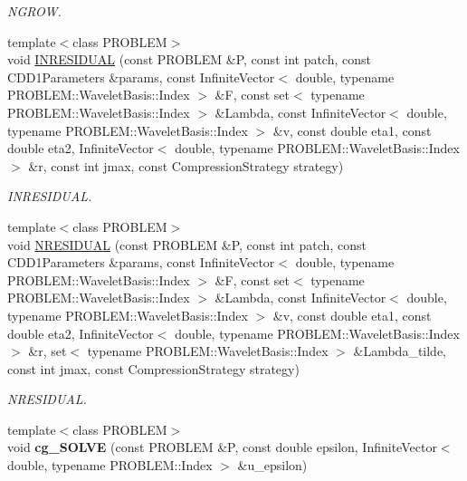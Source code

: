 \begin{CompactItemize}
\begin{CompactList}\small\item\em NGROW. \item\end{CompactList}\item 
{\footnotesize template$<$class PROBLEM$>$ }\\void \hyperlink{namespaceFrameTL_cd7462527bff134a7c142ee0471d6ab2}{INRESIDUAL} (const PROBLEM \&P, const int patch, const CDD1Parameters \&params, const InfiniteVector$<$ double, typename PROBLEM::WaveletBasis::Index $>$ \&F, const set$<$ typename PROBLEM::WaveletBasis::Index $>$ \&Lambda, const InfiniteVector$<$ double, typename PROBLEM::WaveletBasis::Index $>$ \&v, const double eta1, const double eta2, InfiniteVector$<$ double, typename PROBLEM::WaveletBasis::Index $>$ \&r, const int jmax, const CompressionStrategy strategy)
\begin{CompactList}\small\item\em INRESIDUAL. \item\end{CompactList}\item 
{\footnotesize template$<$class PROBLEM$>$ }\\void \hyperlink{namespaceFrameTL_e86daf5e125e66504844e002ba3dc4b5}{NRESIDUAL} (const PROBLEM \&P, const int patch, const CDD1Parameters \&params, const InfiniteVector$<$ double, typename PROBLEM::WaveletBasis::Index $>$ \&F, const set$<$ typename PROBLEM::WaveletBasis::Index $>$ \&Lambda, const InfiniteVector$<$ double, typename PROBLEM::WaveletBasis::Index $>$ \&v, const double eta1, const double eta2, InfiniteVector$<$ double, typename PROBLEM::WaveletBasis::Index $>$ \&r, set$<$ typename PROBLEM::WaveletBasis::Index $>$ \&Lambda\_\-tilde, const int jmax, const CompressionStrategy strategy)
\begin{CompactList}\small\item\em NRESIDUAL. \item\end{CompactList}\item 
\hypertarget{namespaceFrameTL_391c8708bf59582ba636bfb5a394d2b7}{
{\footnotesize template$<$class PROBLEM$>$ }\\void \textbf{cg\_\-SOLVE} (const PROBLEM \&P, const double epsilon, InfiniteVector$<$ double, typename PROBLEM::Index $>$ \&u\_\-epsilon)}
\label{namespaceFrameTL_391c8708bf59582ba636bfb5a394d2b7}


\end{CompactItemize}

